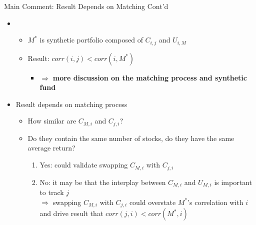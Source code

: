 \documentclass[12pt, aspectratio = 169%
]{beamer}
\newcommand{\1}{{\mathbbm{1}}}
\begin{document}
\begin{frame}{Main Comment: Result Depends on Matching Cont'd}
\vspace*{-1em}
	\begin{itemize}	
		\item
		\begin{itemize} 
			\item \small$M^*$ is synthetic portfolio composed of $C_{i,j}$ and $U_{i,M}$
			\item \small Result: $corr(i,j) < corr(i,M^*)$
				\begin{itemize}
					\item $\Rightarrow$ \textbf{more discussion on the matching process and synthetic fund}
				\end{itemize}
		\end{itemize}
	\end{itemize}
	
	\begin{itemize}
			\item \small Result depends on matching process
				\begin{itemize}
					\item How similar are $C_{M,i}$ and $C_{j,i}$? 
					\item Do they contain the same number of stocks, do they have the same average return?
					\begin{enumerate}
						\item Yes: could validate swapping $C_{M,i}$ with $C_{j,i}$
						\item No: it may be that the interplay between $C_{M,i}$ and $U_{M,i}$ is 											important to track $j$ \\
							$\Rightarrow$ swapping $C_{M,i}$ with $C_{j,i}$ could overstate $M^*$'s correlation 							with $i$ and drive result that $corr(j,i) < corr(M^*,i)$
					\end{enumerate}
				\end{itemize}
		\end{itemize}

\end{frame}
\end{document}

